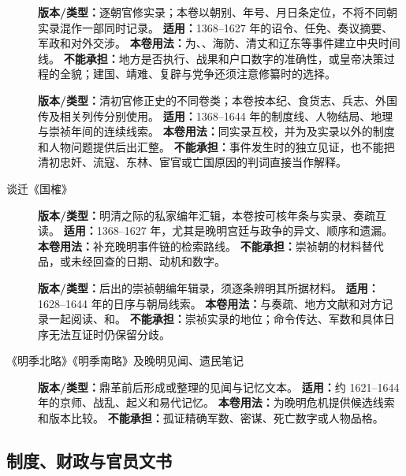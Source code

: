 \begin{description}
  \item[] \textbf{版本/类型：}逐朝官修实录；本卷以朝别、年号、月日条定位，不将不同朝实录混作一部同时记录。 \textbf{适用：}1368--1627 年的诏令、任免、奏议摘要、军政和对外交涉。 \textbf{本卷用法：}为、、海防、清丈和辽东等事件建立中央时间线。 \textbf{不能承担：}地方是否执行、战果和户口数字的准确性，或皇帝决策过程的全貌；建国、靖难、复辟与党争还须注意修纂时的选择。
  \item[] \textbf{版本/类型：}清初官修正史的不同卷类；本卷按本纪、食货志、兵志、外国传及相关列传分别使用。 \textbf{适用：}1368--1644 年的制度线、人物结局、地理与崇祯年间的连续线索。 \textbf{本卷用法：}同实录互校，并为及实录以外的制度和人物问题提供后出汇整。 \textbf{不能承担：}事件发生时的独立见证，也不能把清初忠奸、流寇、东林、宦官或亡国原因的判词直接当作解释。
  \item[谈迁《国榷》] \textbf{版本/类型：}明清之际的私家编年汇辑，本卷按可核年条与实录、奏疏互读。 \textbf{适用：}1368--1627 年，尤其是晚明宫廷与政争的异文、顺序和遗漏。 \textbf{本卷用法：}补充晚明事件链的检索路线。 \textbf{不能承担：}崇祯朝的材料替代品，或未经回查的日期、动机和数字。
  \item[] \textbf{版本/类型：}后出的崇祯朝编年辑录，须逐条辨明其所据材料。 \textbf{适用：}1628--1644 年的日序与朝局线索。 \textbf{本卷用法：}与奏疏、地方文献和对方记录一起阅读、和。 \textbf{不能承担：}崇祯实录的地位；命令传达、军数和具体日序无法互证时仍保留分歧。
  \item[《明季北略》《明季南略》及晚明见闻、遗民笔记] \textbf{版本/类型：}鼎革前后形成或整理的见闻与记忆文本。 \textbf{适用：}约 1621--1644 年的京师、战乱、起义和易代记忆。 \textbf{本卷用法：}为晚明危机提供候选线索和版本比较。 \textbf{不能承担：}孤证精确军数、密谋、死亡数字或人物品格。
\end{description}

\subsection{制度、财政与官员文书}

